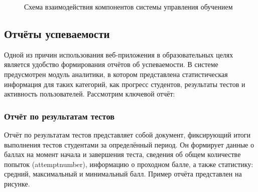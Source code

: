 \begin{figure}[ht]
	\centering
	\caption{Схема взаимодействия компонентов системы управления обучением}
	\label{system:image}
\end{figure}


\subsection{Отчёты успеваемости}
Одной из причин использования веб-приложения в образовательных целях является удобство формирования отчётов об успеваемости. В системе предусмотрен модуль аналитики, в котором представлена статистическая информация для таких категорий, как прогресс студентов, результаты тестов и активность пользователей. Рассмотрим ключевой отчёт:

\subsubsection{Отчёт по результатам тестов}
Отчёт по результатам тестов представляет собой документ, фиксирующий итоги выполнения тестов студентами за определённый период. Он формирует данные о баллах на момент начала и завершения теста, сведения об общем количестве попыток (attemptnumber), информацию о проходном балле, а также статистику: средний, максимальный и минимальный балл. Пример отчёта представлен на рисунке. 

